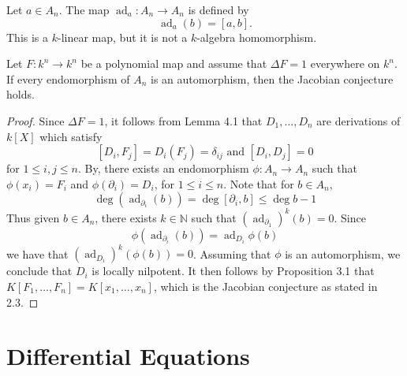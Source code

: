 \documentclass[12pt, oneside]{book}
\begin{document}
\begin{definition}
    Let $a \in A_n$. The map $\operatorname{ad}_a: A_n \rightarrow A_n$ is defined by
    \begin{equation*}
        \operatorname{ad}_a(b)=[a, b] .
    \end{equation*}
    This is a $k$-linear map, but it is not a $k$-algebra homomorphism.
\end{definition}
\begin{theorem}
    Let $F: k^n \rightarrow k^n$ be a polynomial map and assume that $\Delta F=1$ everywhere on $k^n$. If every endomorphism of $A_n$ is an automorphism, then the Jacobian conjecture holds.
    \begin{proof}
        Since $\Delta F=1$, it follows from Lemma 4.1 that $D_1, \ldots, D_n$ are derivations of $k[X]$ which satisfy
        \begin{equation*}
            \left[D_i, F_j\right]=D_i\left(F_j\right)=\delta_{i j} \text { and }\left[D_i, D_j\right]=0
        \end{equation*}
        for $1 \leq i, j \leq n$. By, there exists an endomorphism $\phi: A_n \rightarrow A_n$ such that $\phi\left(x_i\right)=F_i$ and $\phi\left(\partial_i\right)=D_i$, for $1 \leq i \leq n$. Note that for $b \in A_n$,
        \begin{equation*}
            \operatorname{deg}\left(\operatorname{ad}_{\partial_i}(b)\right)=\operatorname{deg}\left[\partial_i, b\right] \leq \operatorname{deg} b-1
        \end{equation*}
        Thus given $b \in A_n$, there exists $k \in \mathbb{N}$ such that $\left(\operatorname{ad}_{\partial_1}\right)^k(b)=0$. Since
        \begin{equation*}
            \phi\left(\operatorname{ad}_{\partial_i}(b)\right)=\operatorname{ad}_{D_i} \phi(b)
        \end{equation*}
        we have that $\left(\operatorname{ad}_{D_i}\right)^k(\phi(b))=0$. Assuming that $\phi$ is an automorphism, we conclude that $D_i$ is locally nilpotent. It then follows by Proposition 3.1 that $K\left[F_1, \ldots, F_n\right]=K\left[x_1, \ldots, x_n\right]$, which is the Jacobian conjecture as stated in 2.3.
    \end{proof}
\end{theorem}







\chapter{Differential Equations}
\end{document}
